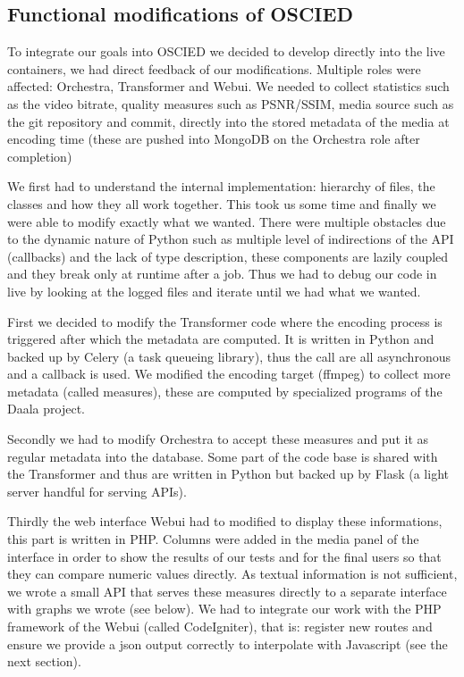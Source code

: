 \documentclass[a4paper,12pt]{article}
\begin{document}

\subsection{Functional modifications of OSCIED}
To integrate our goals into OSCIED we decided to develop directly into the live
containers, we had direct feedback of our modifications.  Multiple roles were
affected: Orchestra, Transformer and Webui.  We needed to collect statistics
such as the video bitrate, quality measures such as PSNR/SSIM, media source such
as the git repository and commit, directly into the stored metadata of the media
at encoding time (these are pushed into MongoDB on the Orchestra role after
completion)

We first had to understand the internal implementation: hierarchy of files, the
classes and how they all work together.  This took us some time and finally we
were able to modify exactly what we wanted.  There were multiple obstacles due
to the dynamic nature of Python such as multiple level of indirections of the
API (callbacks) and the lack of type description, these components are lazily
coupled and they break only at runtime after a job.  Thus we had to debug our
code in live by looking at the logged files and iterate until we had what we
wanted.

First we decided to modify the Transformer code where the encoding process is
triggered after which the metadata are computed.  It is written in Python and
backed up by Celery (a task queueing library), thus the call are all asynchronous and a callback is
used.  We modified the encoding target (ffmpeg) to collect more metadata
(called measures), these are computed by specialized programs of the Daala
project.

Secondly we had to modify Orchestra to accept these measures and put it as
regular metadata into the database. Some part of the code base is shared with
the Transformer and thus are written in Python but backed up by Flask (a light
server handful for serving APIs).

Thirdly the web interface Webui had to modified to display these informations,
this part is written in PHP.  Columns were added in the media panel of the
interface in order to show the results of our tests and for the final users
so that they can compare numeric values directly.  As textual information is not
sufficient, we wrote a small API that serves these measures directly to a
separate interface with graphs we wrote (see below).  We had to integrate our work with the PHP
framework of the Webui (called CodeIgniter), that is: register new routes and
ensure we provide a json output correctly to interpolate with Javascript (see
the next section).
\end{document}
